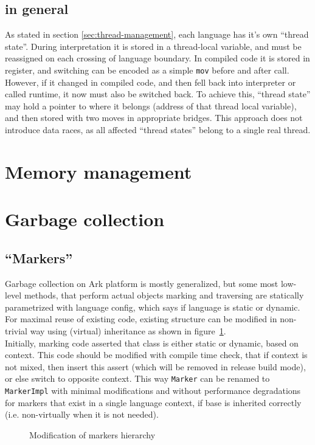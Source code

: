 \documentclass[times, %
	specification,annotation, %
	titlepage-extra-ru,specification-extra-ru,annotation-extra-ru, %
	languages={russian,english} %
	]{itmo-student-thesis}
\begin{document}
\subsection{in general}
As stated in section \ref{sec:thread-management}, each language has it's own ``thread state''. During interpretation it is stored in a thread-local variable, and must be reassigned on each crossing of language boundary. In compiled code it is stored in register, and switching can be encoded as a simple \texttt{mov} before and after call. However, if it changed in compiled code, and then fell back into interpreter or called runtime, it now must also be switched back. To achieve this, ``thread state'' may hold a pointer to where it belongs (address of that thread local variable), and then stored with two moves in appropriate bridges. This approach does not introduce data races, as all affected ``thread states'' belong to a single real thread.

\section{Memory management}

\section{Garbage collection}
\subsection{``Markers''}
Garbage collection on Ark platform is mostly generalized, but some most low-level methods, that perform actual objects marking and traversing are statically parametrized with language config, which says if language is static or dynamic. For maximal reuse of existing code, existing structure can be modified in non-trivial way using (virtual) inheritance as shown in figure~\ref{fig:gc-markers}.\\
Initially, marking code asserted that class is either static or dynamic, based on context. This code should be modified with compile time check, that if context is not mixed, then insert this assert (which will be removed in release build mode), or else switch to opposite context. This way \texttt{Marker} can be renamed to \texttt{MarkerImpl} with minimal modifications and without performance degradations for markers that exist in a single language context, if base is inherited correctly (i.e. non-virtually when it is not needed).\\
\begin{figure}[H]
\caption{Modification of markers hierarchy}\label{fig:gc-markers}
\centering
\end{figure}
\end{document}
